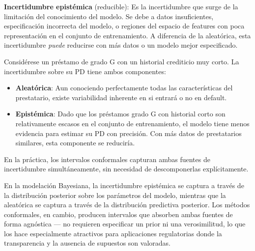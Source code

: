 \documentclass[
  spanish,
  11pt,
  letterpaper,
]{scrbook}
\providecommand{\tightlist}{%
  \setlength{\itemsep}{0pt}\setlength{\parskip}{0pt}}
\theoremstyle{plain}
\theoremstyle{remark}
\begin{document}
\textbf{Incertidumbre epistémica} (reducible): Es la incertidumbre que
surge de la limitación del conocimiento del modelo. Se debe a datos
insuficientes, especificación incorrecta del modelo, o regiones del
espacio de features con poca representación en el conjunto de
entrenamiento. A diferencia de la aleatórica, esta incertidumbre
\emph{puede} reducirse con más datos o un modelo mejor especificado.

\begin{tcolorbox}[enhanced jigsaw, arc=.35mm, bottomrule=.15mm, bottomtitle=1mm, breakable, colback=white, colbacktitle=quarto-callout-note-color!10!white, colframe=quarto-callout-note-color-frame, coltitle=black, left=2mm, leftrule=.75mm, opacityback=0, opacitybacktitle=0.6, rightrule=.15mm, title=\textcolor{quarto-callout-note-color}{\faInfo}\hspace{0.5em}{Ejemplo en riesgo crediticio}, titlerule=0mm, toprule=.15mm, toptitle=1mm]

Considérese un préstamo de grado G con un historial crediticio muy
corto. La incertidumbre sobre su PD tiene ambos componentes:

\begin{itemize}
\tightlist
\item
  \textbf{Aleatórica}: Aun conociendo perfectamente todas las
  características del prestatario, existe variabilidad inherente en si
  entrará o no en default.
\item
  \textbf{Epistémica}: Dado que los préstamos grado G con historial
  corto son relativamente escasos en el conjunto de entrenamiento, el
  modelo tiene menos evidencia para estimar su PD con precisión. Con más
  datos de prestatarios similares, esta componente se reduciría.
\end{itemize}

En la práctica, los intervalos conformales capturan ambas fuentes de
incertidumbre simultáneamente, sin necesidad de descomponerlas
explícitamente.

\end{tcolorbox}

En la modelación Bayesiana, la incertidumbre epistémica se captura a
través de la distribución posterior sobre los parámetros del modelo,
mientras que la aleatórica se captura a través de la distribución
predictiva posterior. Los métodos conformales, en cambio, producen
intervalos que absorben ambas fuentes de forma agnóstica --- no
requieren especificar un prior ni una verosimilitud, lo que los hace
especialmente atractivos para aplicaciones regulatorias donde la
transparencia y la ausencia de supuestos son valoradas.
\end{document}
